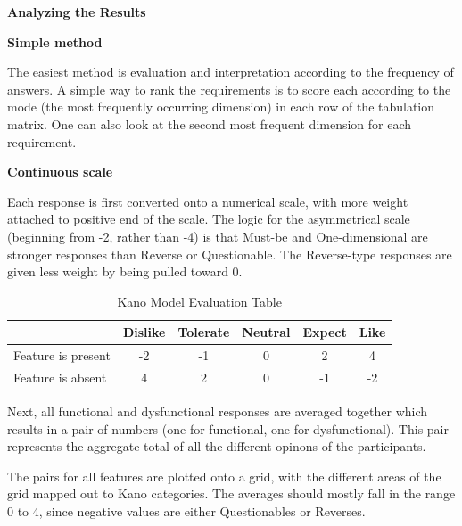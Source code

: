 \documentclass[../main.tex]{subfiles}
\begin{document}
\textbf{Analyzing the Results}

\textbf{Simple method}

The easiest method is evaluation and interpretation according to the frequency of answers. A simple way to rank the requirements is to score each according to the mode (the most frequently occurring dimension) in each row of the tabulation matrix. One can also look at the second most frequent dimension for each requirement. \cite{berger1993kano}

\textbf{Continuous scale}

 Each response is first converted onto a numerical scale, with more weight attached to positive end of the scale.  The logic for the asymmetrical scale 
(beginning from -2, rather than -4) is that Must-be and One-dimensional are stronger responses than Reverse or Questionable. The Reverse-type responses are given less weight by being pulled toward 0. 

\begin{table}[H]
    \centering
    \begin{tabular}{lccccc}
        \hline
        & Dislike & Tolerate & Neutral & Expect & Like \\
        \hline
        Feature is present & -2 & -1 & 0 & 2 & 4 \\
        Feature is absent  & 4  & 2  & 0 & -1 & -2 \\
        \hline
    \end{tabular}
    \caption{Kano Model Evaluation Table}
    \label{tab:kano}
\end{table}

Next, all functional and dysfunctional responses are averaged together which results in a pair of numbers (one for functional, one for dysfunctional). This pair represents the aggregate total of all the different opinons of the participants.

The pairs for all features are plotted onto a grid, with the different areas of the grid mapped out to Kano categories. The averages should mostly fall in the range 0 to 4, since negative values are either Questionables or Reverses.
\end{document}
